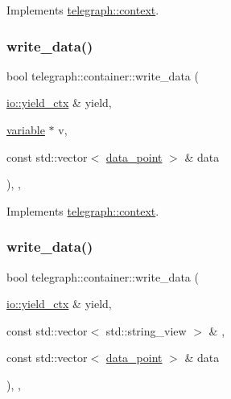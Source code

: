 Implements \hyperlink{classtelegraph_1_1context_aec3b3b0d7210a86f2ea2f5067ef8e922}{telegraph\+::context}.

\mbox{\label{classtelegraph_1_1container_aad8390913b2961a2270e6d4065deb59b}} 
\subsubsection{\texorpdfstring{write\+\_\+data()}{write\_data()}\hspace{0.1cm}{\footnotesize\ttfamily [1/2]}}
{\footnotesize\ttfamily bool telegraph\+::container\+::write\+\_\+data (\begin{DoxyParamCaption}\item[{\hyperlink{structboost_1_1asio_1_1yield__ctx}{io\+::yield\+\_\+ctx} \&}]{yield,  }\item[{\hyperlink{classtelegraph_1_1variable}{variable} $\ast$}]{v,  }\item[{const std\+::vector$<$ \hyperlink{classtelegraph_1_1data__point}{data\+\_\+point} $>$ \&}]{data }\end{DoxyParamCaption})\hspace{0.3cm}{\ttfamily [inline]}, {\ttfamily [override]}, {\ttfamily [virtual]}}



Implements \hyperlink{classtelegraph_1_1context_a6067b9a6f2590733c81f6a3b2ed9cba7}{telegraph\+::context}.

\mbox{\label{classtelegraph_1_1container_a6c608535adf0fee7783f6684ab4b69c8}} 
\subsubsection{\texorpdfstring{write\+\_\+data()}{write\_data()}\hspace{0.1cm}{\footnotesize\ttfamily [2/2]}}
{\footnotesize\ttfamily bool telegraph\+::container\+::write\+\_\+data (\begin{DoxyParamCaption}\item[{\hyperlink{structboost_1_1asio_1_1yield__ctx}{io\+::yield\+\_\+ctx} \&}]{yield,  }\item[{const std\+::vector$<$ std\+::string\+\_\+view $>$ \&}]{,  }\item[{const std\+::vector$<$ \hyperlink{classtelegraph_1_1data__point}{data\+\_\+point} $>$ \&}]{data }\end{DoxyParamCaption})\hspace{0.3cm}{\ttfamily [inline]}, {\ttfamily [override]}, {\ttfamily [virtual]}}



